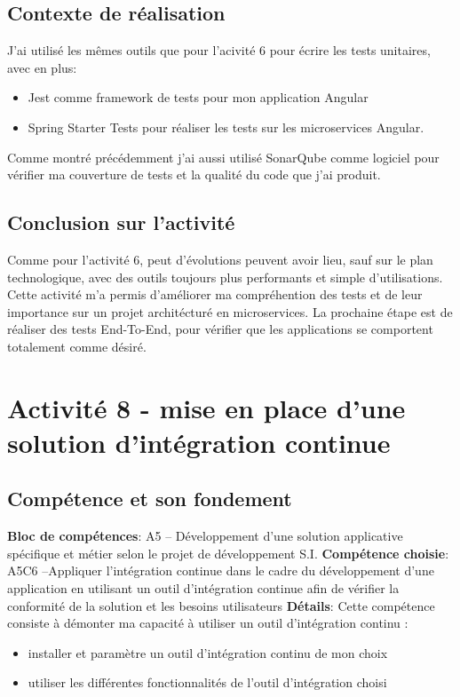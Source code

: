 \documentclass[a4paper, 11pt]{report}
\begin{document}
\subsection{Contexte de réalisation}
J'ai utilisé les mêmes outils que pour l'acivité 6 pour écrire les tests
unitaires, avec en plus:
\begin{itemize}
\tightlist
\item
  Jest comme framework de tests pour mon application Angular
\item
  Spring Starter Tests pour réaliser les tests sur les microservices
  Angular.
\end{itemize}
Comme montré précédemment j'ai aussi utilisé SonarQube comme logiciel
pour vérifier ma couverture de tests et la qualité du code que j'ai
produit.
\subsection{Conclusion sur l'activité}
Comme pour l'activité 6, peut d'évolutions peuvent avoir lieu, sauf sur le plan technologique, avec des outils toujours plus performants et simple d'utilisations.
\newline
\newline
Cette activité m'a permis d'améliorer ma compréhention des tests et de leur importance sur un projet architécturé en microservices. La prochaine étape est de réaliser des tests End-To-End, pour vérifier que les applications se comportent totalement comme désiré.

\section{Activité 8 - mise en place d’une solution d’intégration continue}
\subsection{Compétence et son fondement}
\textbf{Bloc de compétences}: A5 – Développement d’une solution applicative spécifique et métier selon le projet de développement S.I.
\newline
\textbf{Compétence choisie}: A5C6 –Appliquer l’intégration continue dans le cadre du développement d’une application en utilisant un outil d’intégration continue afin de vérifier la conformité de la solution et les besoins utilisateurs
\newline
\textbf{Détails}: Cette compétence consiste à démonter ma capacité à utiliser un outil d’intégration continu :
\begin{itemize}
  \item installer et paramètre un outil d’intégration continu de mon choix
  \item utiliser les différentes fonctionnalités de l’outil d’intégration choisi
\end{itemize}
\end{document}
